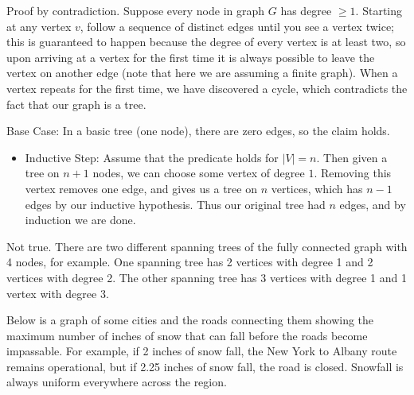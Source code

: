 \documentclass[solution, letterpaper]{cs20}
\begin{document}
\begin{solution}
\subsolution Proof by contradiction. Suppose every node in graph $G$ has degree $\geq 1$. Starting at any vertex $v$, follow a sequence of distinct edges until you see a vertex twice; this is guaranteed to happen because the degree of every vertex is at least two, so upon arriving at a vertex for the first time it is always possible to leave the vertex on another edge (note that here we are assuming a finite graph). When a vertex repeats for the first time, we have discovered a cycle, which contradicts the fact that our graph is a tree.

\subsolution Base Case: In a basic tree (one node), there are zero edges, so the claim holds. 
\begin{itemize}
\item[] Inductive Step: Assume that the predicate holds for $|V|=n.$ Then given a tree on $n+1$ nodes, we can choose some vertex of degree $1$.  Removing this vertex removes one edge, and gives us a tree on $n$ vertices, which has $n-1$ edges by our inductive hypothesis. Thus our original tree had $n$ edges, and by induction we are done.  
\end{itemize}

\subsolution Not true. There are two different spanning trees of the fully connected graph with 4 nodes, for example. One spanning tree has 2 vertices with degree 1 and 2 vertices with degree 2. The other spanning tree has 3 vertices with degree 1 and 1 vertex with degree 3.

\end{solution}



Below is a graph of some cities and the roads connecting them showing the maximum number of inches of snow that can fall before the roads become impassable. For example, if 2 inches of snow fall, the New York to Albany route remains operational, but if 2.25 inches of snow fall, the road is closed. Snowfall is always uniform everywhere across the region.

\medskip
\end{document}

